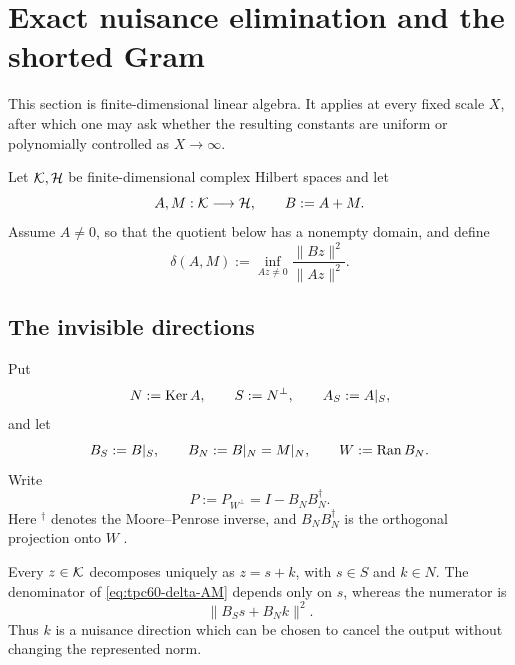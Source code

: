 \section{Exact nuisance elimination and the shorted Gram}
\label{sec:tpc60-shorted-gram}

This section is finite-dimensional linear algebra.  It applies at every
fixed scale \(X\), after which one may ask whether the resulting constants
are uniform or polynomially controlled as \(X\to\infty\).

Let \(\mathcal K,\mathcal H\) be finite-dimensional complex Hilbert spaces and let
\begin{equation}
 A,M:\mathcal K\longrightarrow\mathcal H,
 \qquad B:=A+M.
 \label{eq:tpc60-abstract-AMB}
\end{equation}
Assume \(A\ne0\), so that the quotient below has a nonempty domain, and
define
\begin{equation}
 \delta(A,M)
 :=\inf_{Az\ne0}\frac{\|Bz\|^2}{\|Az\|^2}.
 \label{eq:tpc60-delta-AM}
\end{equation}

\subsection{The invisible directions}

Put
\begin{equation}
 N:=\operatorname{Ker} A,
 \qquad S:=N^\perp,
 \qquad A_S:=A|_S,
 \label{eq:tpc60-NSAS}
\end{equation}
and let
\begin{equation}
 B_S:=B|_S,
 \qquad B_N:=B|_N=M|_N,
 \qquad W:=\operatorname{Ran} B_N.
 \label{eq:tpc60-BSBNW}
\end{equation}
Write
\begin{equation}
 P:=P_{W^\perp}=I-B_NB_N^\dagger.
 \label{eq:tpc60-projection-P}
\end{equation}
Here \({}^\dagger\) denotes the Moore--Penrose inverse, and
\(B_NB_N^\dagger\) is the orthogonal projection onto \(W\)
\citep{BenIsraelGreville2003}.

Every \(z\in\mathcal K\) decomposes uniquely as \(z=s+k\), with \(s\in S\) and
\(k\in N\).  The denominator of \eqref{eq:tpc60-delta-AM} depends only on
\(s\), whereas the numerator is
\begin{equation}
 \|B_Ss+B_Nk\|^2.
 \label{eq:tpc60-nuisance-numerator}
\end{equation}
Thus \(k\) is a nuisance direction which can be chosen to cancel the output
without changing the represented norm.

